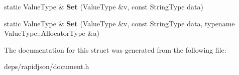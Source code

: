 \begin{DoxyCompactItemize}
\item 
static Value\+Type \& {\bfseries Set} (Value\+Type \&v, const String\+Type data)\hypertarget{structinternal_1_1_type_helper_3_01_value_type_00_01const_01typename_01_value_type_1_1_ch_01_5_01_4_af3a44a3b6f485a71a73af69d30668c8f}{}\label{structinternal_1_1_type_helper_3_01_value_type_00_01const_01typename_01_value_type_1_1_ch_01_5_01_4_af3a44a3b6f485a71a73af69d30668c8f}

\item 
static Value\+Type \& {\bfseries Set} (Value\+Type \&v, const String\+Type data, typename Value\+Type\+::\+Allocator\+Type \&a)\hypertarget{structinternal_1_1_type_helper_3_01_value_type_00_01const_01typename_01_value_type_1_1_ch_01_5_01_4_a8588f2ab1d0ffbb4c1810d60a500a8c5}{}\label{structinternal_1_1_type_helper_3_01_value_type_00_01const_01typename_01_value_type_1_1_ch_01_5_01_4_a8588f2ab1d0ffbb4c1810d60a500a8c5}

\end{DoxyCompactItemize}


The documentation for this struct was generated from the following file\+:\begin{DoxyCompactItemize}
\item 
deps/rapidjson/document.\+h\end{DoxyCompactItemize}
